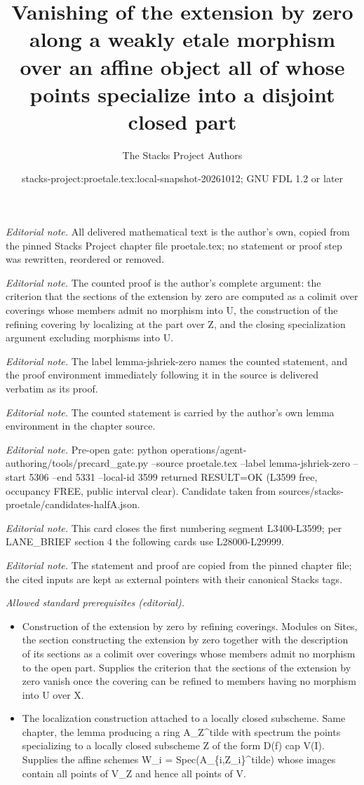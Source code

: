 \documentclass[10pt,a4paper]{amsart}
\title{Vanishing of the extension by zero along a weakly etale morphism over an affine object all of whose points specialize into a disjoint closed part}
\author{The Stacks Project Authors}
\date{stacks-project:proetale.tex:local-snapshot-20261012; GNU FDL 1.2 or later}
\theoremstyle{plain}
\theoremstyle{definition}
\theoremstyle{remark}
\numberwithin{equation}{subsection}
\begin{document}
\maketitle
\noindent\textit{Editorial note.} All delivered mathematical text is the author's own, copied from the pinned Stacks Project chapter file proetale.tex; no statement or proof step was rewritten, reordered or removed.\par\medskip
\noindent\textit{Editorial note.} The counted proof is the author's complete argument: the criterion that the sections of the extension by zero are computed as a colimit over coverings whose members admit no morphism into U, the construction of the refining covering by localizing at the part over Z, and the closing specialization argument excluding morphisms into U.\par\medskip
\noindent\textit{Editorial note.} The label lemma-jshriek-zero names the counted statement, and the proof environment immediately following it in the source is delivered verbatim as its proof.\par\medskip
\noindent\textit{Editorial note.} The counted statement is carried by the author's own lemma environment in the chapter source.\par\medskip
\noindent\textit{Editorial note.} Pre-open gate: python operations/agent-authoring/tools/precard\_gate.py --source proetale.tex --label lemma-jshriek-zero --start 5306 --end 5331 --local-id 3599 returned RESULT=OK (L3599 free, occupancy FREE, public interval clear). Candidate taken from sources/stacks-proetale/candidates-halfA.json.\par\medskip
\noindent\textit{Editorial note.} This card closes the first numbering segment L3400-L3599; per LANE\_BRIEF section 4 the following cards use L28000-L29999.\par\medskip
\noindent\textit{Editorial note.} The statement and proof are copied from the pinned chapter file; the cited inputs are kept as external pointers with their canonical Stacks tags.\par\medskip
\noindent\textit{Allowed standard prerequisites (editorial).}\begin{itemize}
\item Construction of the extension by zero by refining coverings. Modules on Sites, the section constructing the extension by zero together with the description of its sections as a colimit over coverings whose members admit no morphism to the open part. Supplies the criterion that the sections of the extension by zero vanish once the covering can be refined to members having no morphism into U over X.
\item The localization construction attached to a locally closed subscheme. Same chapter, the lemma producing a ring A\_Z\textasciicircum{}tilde with spectrum the points specializing to a locally closed subscheme Z of the form D(f) cap V(I). Supplies the affine schemes W\_i = Spec(A\_\{i,Z\_i\}\textasciicircum{}tilde) whose images contain all points of V\_Z and hence all points of V.
\end{itemize}\medskip
\end{document}
